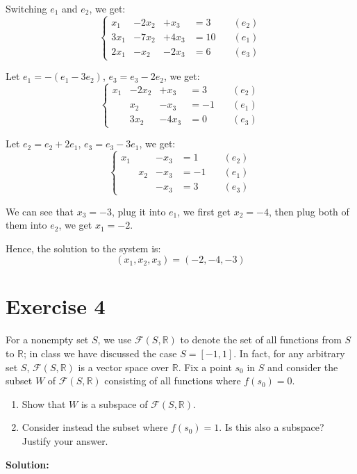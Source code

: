\documentclass{article}
\begin{document}
Switching $e_1$ and $e_2$, we get:
\[
\left\{
\begin{aligned}
x_1&-2x_2&+x_3 &= 3 &\quad (e_2)\\
3x_1&-7x_2&+4x_3 &= 10 &\quad (e_1)\\
2x_1&-x_2&-2x_3 &= 6 &\quad (e_3)
\end{aligned}
\right.
\]

Let $e_1 = -(e_1 - 3e_2)$, $e_3 = e_3 - 2e_2$, we get:
\[
\left\{
\begin{aligned}
x_1&-2x_2&+x_3 &= 3 &\quad (e_2)\\
&x_2&-x_3&= -1 &\quad (e_1)\\
&3x_2&-4x_3&= 0 &\quad (e_3)
\end{aligned}
\right.
\]

Let $e_2 = e_2 + 2e_1$, $e_3 = e_3 - 3e_1$, we get:
\[
\left\{
\begin{aligned}
x_1&&-x_3 &= 1 &\quad (e_2)\\
&x_2&-x_3&= -1 &\quad (e_1)\\
&&-x_3&= 3 &\quad (e_3)
\end{aligned}
\right.
\]

We can see that $x_3 = -3$, plug it into $e_1$, we first get $x_2 = -4$, then plug both of them into $e_2$, we get $x_1 = -2$.

Hence, the solution to the system is:
\[
(x_1, x_2, x_3) = (-2, -4, -3)
\]

\newpage

\section*{Exercise 4}
For a nonempty set $S$, we use $\mathcal{F}(S,\mathbb{R})$ to denote the set of all functions from $S$ to $\mathbb{R}$; in class we have discussed the case $S = [-1,1]$. In fact, for any arbitrary set $S$, $\mathcal{F}(S,\mathbb{R})$ is a vector space over $\mathbb{R}$. Fix a point $s_0$ in $S$ and consider the subset $W$ of $\mathcal{F}(S,\mathbb{R})$ consisting of all functions where $f(s_0) = 0$.
\begin{enumerate}[label=(\alph*)]
\item Show that $W$ is a subspace of $\mathcal{F}(S,\mathbb{R})$.
\item Consider instead the subset where $f(s_0) = 1$. Is this also a subspace? Justify your answer.
\end{enumerate}

\textbf{Solution:}
\end{document}
